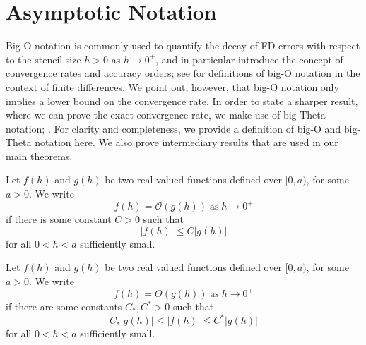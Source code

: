 \documentclass[12pt]{article}
\begin{document}
\appendix

\section{Asymptotic Notation}\label{app:asymp}
Big-O notation is commonly used to quantify the decay of FD errors with respect to the stencil size $h>0$ as $h\to0^+$, and in particular introduce the concept of convergence rates and accuracy orders; see \cite{atkinson2004, leveque2007} for definitions of big-O notation in the context of finite differences.
We point out, however, that big-O notation only implies a lower bound on the convergence rate.
In order to state a sharper result, where we can prove the exact convergence rate, we make use of big-Theta notation; \cite{knuth1997}.
For clarity and completeness, we provide a definition of big-O and big-Theta notation here.
We also prove intermediary results that are used in our main theorems.

%
\begin{definition}\label{def:BigO}
Let $f(h)$ and $g(h)$ be two real valued functions defined over $[0,a)$, for some $a>0$.
We write
\[
	f(h) = \mathcal O(g(h)) \; \text{as} \; h\to 0^+
\]
if there is some constant $C>0$ such that
\[
	|f(h)| \le C|g(h)|
\]
for all $0<h<a$ sufficiently small.
\end{definition}

%
\begin{definition}\label{def:BigTheta}
Let $f(h)$ and $g(h)$ be two real valued functions defined over $[0,a)$, for some $a>0$.
We write
\[
	f(h) = \Theta(g(h)) \; \text{as} \; h\to 0^+
\]
if there are some constants $C_*,C^*>0$ such that
\[
	C_*|g(h)| \le |f(h)| \le C^*|g(h)|
\]
for all $0<h<a$ sufficiently small.
\end{definition}
\end{document}
